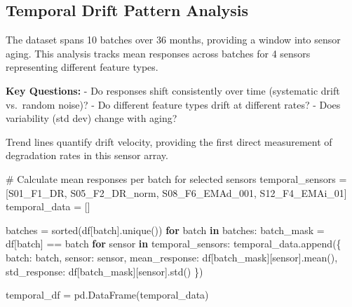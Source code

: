 \documentclass[
  letterpaper,
  DIV=11,
  numbers=noendperiod]{scrartcl}
\newenvironment{Shaded}{\begin{snugshade}}{\end{snugshade}}
\newcommand{\BuiltInTok}[1]{\textcolor[rgb]{0.00,0.23,0.31}{#1}}
\newcommand{\CommentTok}[1]{\textcolor[rgb]{0.37,0.37,0.37}{#1}}
\newcommand{\ControlFlowTok}[1]{\textcolor[rgb]{0.00,0.23,0.31}{\textbf{#1}}}
\newcommand{\KeywordTok}[1]{\textcolor[rgb]{0.00,0.23,0.31}{\textbf{#1}}}
\newcommand{\NormalTok}[1]{\textcolor[rgb]{0.00,0.23,0.31}{#1}}
\newcommand{\OperatorTok}[1]{\textcolor[rgb]{0.37,0.37,0.37}{#1}}
\newcommand{\StringTok}[1]{\textcolor[rgb]{0.13,0.47,0.30}{#1}}
\renewenvironment{Shaded}{%
  \begin{tcolorbox}[%
    enhanced,%
    colback=codebg,%
    colframe=codebg,%
    borderline west={3pt}{0pt}{sectionblue},%
    fontupper=\small\ttfamily,%
    boxrule=0pt,%
    arc=0pt,%
    boxsep=5pt,%
    left=2mm,%
    right=2mm,%
    top=2mm,%
    bottom=2mm%
  ]%
}{%
  \end{tcolorbox}%
}
\begin{document}
\subsection{Temporal Drift Pattern
Analysis}\label{temporal-drift-pattern-analysis}

The dataset spans 10 batches over 36 months, providing a window into
sensor aging. This analysis tracks mean responses across batches for 4
sensors representing different feature types.

\textbf{Key Questions:} - Do responses shift consistently over time
(systematic drift vs.~random noise)? - Do different feature types drift
at different rates? - Does variability (std dev) change with aging?

Trend lines quantify drift velocity, providing the first direct
measurement of degradation rates in this sensor array.

\begin{Shaded}
\begin{Highlighting}[]
\CommentTok{\# Calculate mean responses per batch for selected sensors}
\NormalTok{temporal\_sensors }\OperatorTok{=}\NormalTok{ [}\StringTok{\textquotesingle{}S01\_F1\_DR\textquotesingle{}}\NormalTok{, }\StringTok{\textquotesingle{}S05\_F2\_DR\_norm\textquotesingle{}}\NormalTok{, }\StringTok{\textquotesingle{}S08\_F6\_EMAd\_001\textquotesingle{}}\NormalTok{, }\StringTok{\textquotesingle{}S12\_F4\_EMAi\_01\textquotesingle{}}\NormalTok{]}
\NormalTok{temporal\_data }\OperatorTok{=}\NormalTok{ []}

\NormalTok{batches }\OperatorTok{=} \BuiltInTok{sorted}\NormalTok{(df[}\StringTok{\textquotesingle{}batch\textquotesingle{}}\NormalTok{].unique())}
\ControlFlowTok{for}\NormalTok{ batch }\KeywordTok{in}\NormalTok{ batches:}
\NormalTok{    batch\_mask }\OperatorTok{=}\NormalTok{ df[}\StringTok{\textquotesingle{}batch\textquotesingle{}}\NormalTok{] }\OperatorTok{==}\NormalTok{ batch}
    \ControlFlowTok{for}\NormalTok{ sensor }\KeywordTok{in}\NormalTok{ temporal\_sensors:}
\NormalTok{        temporal\_data.append(\{}
            \StringTok{\textquotesingle{}batch\textquotesingle{}}\NormalTok{: batch,}
            \StringTok{\textquotesingle{}sensor\textquotesingle{}}\NormalTok{: sensor,}
            \StringTok{\textquotesingle{}mean\_response\textquotesingle{}}\NormalTok{: df[batch\_mask][sensor].mean(),}
            \StringTok{\textquotesingle{}std\_response\textquotesingle{}}\NormalTok{: df[batch\_mask][sensor].std()}
\NormalTok{        \})}

\NormalTok{temporal\_df }\OperatorTok{=}\NormalTok{ pd.DataFrame(temporal\_data)}
\end{Highlighting}
\end{Shaded}
\end{document}
